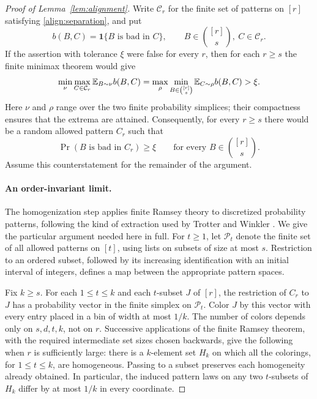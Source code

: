 \begin{proof}[Proof of Lemma~\ref{lem:alignment}]
Write $\mathcal C_r$ for the finite set of patterns on $[r]$ satisfying
\eqref{align:separation}, and put
\[
 b(B,C)=\boldsymbol{1}\{B\text{ is bad in }C\},
 \qquad B\in\binom{[r]}s,\ C\in\mathcal C_r.
\]
If the assertion with tolerance $\xi$ were false for every $r$, then for
each $r\geq s$ the finite minimax theorem \cite{vonNeumann1928} would give
\[
 \min_{\nu}\max_{C\in\mathcal C_r}
       \mathbb E_{B\sim\nu}b(B,C)
 =
 \max_{\rho}\min_{B\in\binom{[r]}s}
       \mathbb E_{C\sim\rho}b(B,C)
 >\xi.
\]
Here $\nu$ and $\rho$ range over the two finite probability simplices;
their compactness ensures that the extrema are attained.  Consequently,
for every $r\geq s$ there would be a random allowed pattern $C_r$ such that
\begin{equation}\label{align:uniform-bad}
 \Pr(B\text{ is bad in }C_r)\geq\xi
 \qquad\text{for every }B\in\binom{[r]}s.
\end{equation}
Assume this counterstatement for the remainder of the argument.

\paragraph{An order-invariant limit.}
The homogenization step applies finite Ramsey theory \cite{Ramsey1930}
to discretized probability patterns, following the kind of extraction
used by Trotter and Winkler \cite{TrotterWinkler1998}. We give the
particular argument needed here in full.
For $t\geq1$, let $\mathcal P_t$ denote the finite set of all allowed
patterns on $[t]$, using lists on subsets of size at most $s$.
Restriction to an ordered subset, followed by its increasing identification
with an initial interval of integers, defines a map between the appropriate
pattern spaces.

Fix $k\geq s$.  For each $1\leq t\leq k$ and each $t$-subset $J$ of
$[r]$, the restriction of $C_r$ to $J$ has a probability vector in the
finite simplex on $\mathcal P_t$.  Color $J$ by this vector with every
entry placed in a bin of width at most $1/k$.  The number of colors depends
only on $s,d,t,k$, not on $r$.  Successive applications of the finite
Ramsey theorem, with the required intermediate set sizes chosen backwards,
give the following when $r$ is sufficiently large: there is a $k$-element
set $H_k$ on which all the colorings, for $1\leq t\leq k$, are
homogeneous.  Passing to a subset preserves each homogeneity already
obtained.  In particular, the induced pattern laws on any two $t$-subsets
of $H_k$ differ by at most $1/k$ in every coordinate.


\end{proof}
